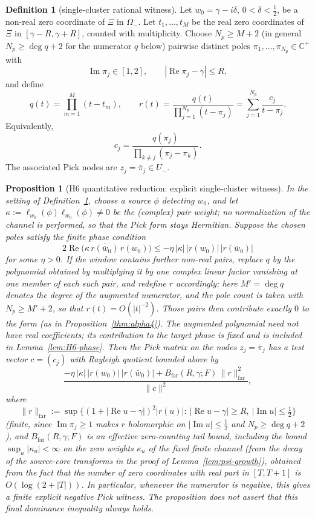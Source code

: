 \documentclass[11pt]{amsart}
\newtheorem{proposition}[theorem]{Proposition}
\theoremstyle{definition}
\newtheorem{definition}[theorem]{Definition}
\theoremstyle{remark}
\theoremstyle{definition}
\renewcommand{\Re}{\operatorname{Re}}
\renewcommand{\Im}{\operatorname{Im}}
\newcommand{\half}{\tfrac{1}{2}}
\newcommand{\C}{\mathbb{C}}
\begin{document}
\begin{definition}[single-cluster rational witness]\label{def:H6-rational-witness}
Let $w_0=\gamma-i\delta$, $0<\delta<\half$, be a non-real zero coordinate of $\Xi$ in
$\Omega_-$.  Let $t_1,\ldots,t_M$ be the real zero coordinates of $\Xi$ in
$[\gamma-R,\gamma+R]$, counted with multiplicity.  Choose $N_p\ge M+2$ (in general $N_p\ge\deg q+2$ for the numerator $q$ below) pairwise distinct poles
$\pi_1,\ldots,\pi_{N_p}\in\C^+$ with
\[
   \Im\pi_j\in[1,2],\qquad |\Re\pi_j-\gamma|\le R,
\]
and define
\[
   q(t)=\prod_{m=1}^M(t-t_m),\qquad
   r(t)=\frac{q(t)}{\prod_{j=1}^{N_p}(t-\pi_j)}
   =
   \sum_{j=1}^{N_p}\frac{c_j}{t-\pi_j}.
\]
Equivalently,
\[
   c_j=\frac{q(\pi_j)}{\prod_{k\ne j}(\pi_j-\pi_k)}.
\]
The associated Pick nodes are $z_j=\bar\pi_j\in U_-$.
\end{definition}

\begin{proposition}[H6 quantitative reduction: explicit single-cluster witness]\label{prop:H6-witness}
In the setting of Definition~\ref{def:H6-rational-witness}, choose a source $\phi$ detecting $w_0$, and
let $\kappa:=\ell_{w_0}(\phi)\overline{\ell_{\bar w_0}(\phi)}\ne0$ be the (complex) pair weight; \emph{no}
normalization of the channel is performed, so that the Pick form stays Hermitian.  Suppose the chosen
poles satisfy the finite phase condition
\[
   2\Re\bigl(\kappa\,\overline{r(\bar w_0)}\,r(w_0)\bigr)
   \le
   -\eta\,|\kappa|\,|r(w_0)|\,|r(\bar w_0)|
\]
for some $\eta>0$.  If the window contains further non-real pairs, replace $q$ by the polynomial
obtained by multiplying it by one complex linear factor vanishing at one member of each such pair, and
redefine $r$ accordingly; here $M'=\deg q$ denotes the degree of the augmented numerator, and the
pole count is taken with $N_p\ge M'+2$, so that $r(t)=O(|t|^{-2})$.  Those pairs then contribute exactly $0$ to the form (as in
Proposition~\ref{thm:alpha4}).  The augmented polynomial need not have real coefficients; its contribution
to the target phase is fixed and is included in Lemma~\ref{lem:H6-phase}.  Then the Pick matrix on the
nodes $z_j=\bar\pi_j$ has a test vector
$c=(c_j)$ with Rayleigh quotient bounded above by
\[
   \frac{
      -\eta\,|\kappa|\,|r(w_0)|\,|r(\bar w_0)|
      + B_{\mathrm{far}}(R,\gamma;F)\,\|r\|_{\mathrm{far}}^2
   }{\|c\|^2},
\]
where
\[
   \|r\|_{\mathrm{far}}
   :=
   \sup\bigl\{(1+|\Re u-\gamma|)^2|r(u)|:\ |\Re u-\gamma|\ge R,\ |\Im u|\le\half\bigr\}
\]
(finite, since $\Im\pi_j\ge1$ makes $r$ holomorphic on $|\Im u|\le\half$ and $N_p\ge\deg q+2$), and
$B_{\mathrm{far}}(R,\gamma;F)$ is an effective zero-counting tail bound, including the bound
$\sup_u|\kappa_u|<\infty$ on the zero weights $\kappa_u$ of the fixed finite channel (from the decay of
the source-core transforms in the proof of Lemma~\ref{lem:psi-growth}), obtained from the fact that the number of zero coordinates with real part in $[T,T+1]$ is
$O(\log(2+|T|))$.  In particular, whenever the numerator is negative, this gives a
finite explicit negative Pick witness.  The proposition does not assert that this final dominance
inequality always holds.
\end{proposition}
\end{document}
